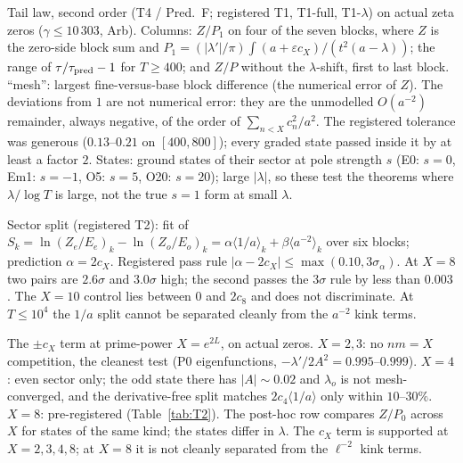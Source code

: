 \begin{table}[p]\centering\scriptsize\setlength\tabcolsep{2.5pt}

\caption{Tail law, second order (T4 / Pred.~F; registered T1, T1-full, T1-$\lambda$) on actual zeta zeros ($\gamma\le10\,303$, Arb). Columns: $Z/P_1$ on four of the seven blocks, where $Z$ is the zero-side block sum and $P_1=(|\lambda'|/\pi)\int(a+\varepsilon c_X)/(t^2(a-\lambda))$; the range of $\tau/\tau_{\rm pred}-1$ for $T\ge400$; and $Z/P$ without the $\lambda$-shift, first to last block. ``mesh'': largest fine-versus-base block difference (the numerical error of $Z$). The deviations from $1$ are not numerical error: they are the unmodelled $O(a^{-2})$ remainder, always negative, of the order of $\sum_{n<X}c_n^2/a^2$. The registered tolerance was generous ($0.13$--$0.21$ on $[400,800]$); every graded state passed inside it by at least a factor $2$. States: ground states of their sector at pole strength $s$ (E0: $s=0$, Em1: $s=-1$, O5: $s=5$, O20: $s=20$); large $|\lambda|$, so these test the theorems where $\lambda/\log T$ is large, not the true $s=1$ form at small $\lambda$.}\label{tab:T1}
\end{table}

\begin{table}[p]\centering\footnotesize\setlength\tabcolsep{3pt}

\caption{Sector split (registered T2): fit of $S_k=\ln(Z_e/E_e)_k-\ln(Z_o/E_o)_k=\alpha\langle1/a\rangle_k+\beta\langle a^{-2}\rangle_k$ over six blocks; prediction $\alpha=2c_X$. Registered pass rule $|\alpha-2c_X|\le\max(0.10,3\sigma_\alpha)$. At $X=8$ two pairs are $2.6\sigma$ and $3.0\sigma$ high; the second passes the $3\sigma$ rule by less than $0.003$. The $X=10$ control lies between $0$ and $2c_8$ and does not discriminate. At $T\le10^4$ the $1/a$ split cannot be separated cleanly from the $a^{-2}$ kink terms.}\label{tab:T2}
\end{table}

\begin{table}[p]\centering\footnotesize\setlength\tabcolsep{3pt}

\caption{The $\pm c_X$ term at prime-power $X=e^{2L}$, on actual zeros. $X=2,3$: no $nm=X$ competition, the cleanest test (P0 eigenfunctions, $-\lambda'/2A^2=0.995$--$0.999$). $X=4$: even sector only; the odd state there has $|A|\sim0.02$ and $\lambda_o$ is not mesh-converged, and the derivative-free split matches $2c_4\langle1/a\rangle$ only within $10$--$30\%$. $X=8$: pre-registered (Table~\ref{tab:T2}). The post-hoc row compares $Z/P_0$ across $X$ for states of the same kind; the states differ in $\lambda$. The $c_X$ term is supported at $X=2,3,4,8$; at $X=8$ it is not cleanly separated from the $\ell^{-2}$ kink terms.}\label{tab:cX}
\end{table}

